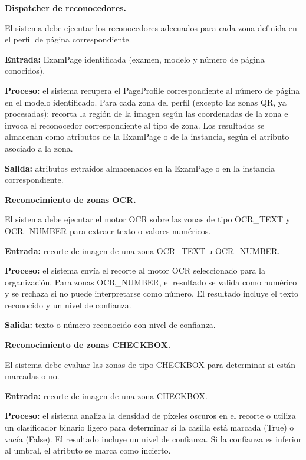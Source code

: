 \begin{functional}
\begin{functional}
    \item \textbf{Dispatcher de reconocedores.}

    El sistema debe ejecutar los reconocedores adecuados para cada zona definida en el perfil de página correspondiente.

    \textbf{Entrada:} ExamPage identificada (examen, modelo y número de página conocidos).

    \textbf{Proceso:} el sistema recupera el PageProfile correspondiente al número de página en el modelo identificado. Para cada zona del perfil (excepto las zonas QR, ya procesadas): recorta la región de la imagen según las coordenadas de la zona e invoca el reconocedor correspondiente al tipo de zona. Los resultados se almacenan como atributos de la ExamPage o de la instancia, según el atributo asociado a la zona.

    \textbf{Salida:} atributos extraídos almacenados en la ExamPage o en la instancia correspondiente.

    \item \textbf{Reconocimiento de zonas OCR.}

    El sistema debe ejecutar el motor OCR sobre las zonas de tipo OCR\_TEXT y OCR\_NUMBER para extraer texto o valores numéricos.

    \textbf{Entrada:} recorte de imagen de una zona OCR\_TEXT u OCR\_NUMBER.

    \textbf{Proceso:} el sistema envía el recorte al motor OCR seleccionado para la organización. Para zonas OCR\_NUMBER, el resultado se valida como numérico y se rechaza si no puede interpretarse como número. El resultado incluye el texto reconocido y un nivel de confianza.

    \textbf{Salida:} texto o número reconocido con nivel de confianza.

    \item \textbf{Reconocimiento de zonas CHECKBOX.}

    El sistema debe evaluar las zonas de tipo CHECKBOX para determinar si están marcadas o no.

    \textbf{Entrada:} recorte de imagen de una zona CHECKBOX.

    \textbf{Proceso:} el sistema analiza la densidad de píxeles oscuros en el recorte o utiliza un clasificador binario ligero para determinar si la casilla está marcada (True) o vacía (False). El resultado incluye un nivel de confianza. Si la confianza es inferior al umbral, el atributo se marca como incierto.


\end{functional}
\end{functional}
